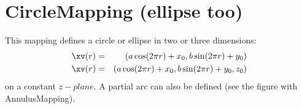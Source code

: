 \section{CircleMapping (ellipse too)}

This mapping defines a circle or ellipse in two or three dimensions:
\begin{eqnarray*}
    \xv(r) &=& ( a \cos(2\pi r)+x_0, b\sin(2\pi r) + y_0 ) \\
    \xv(r) &=& ( a \cos(2\pi r)+x_0, b\sin(2\pi r) + y_0 , z_0 )
\end{eqnarray*}
on a constant $z-plane$.
A partial arc can also be defined (see the figure with AnnulusMapping).


